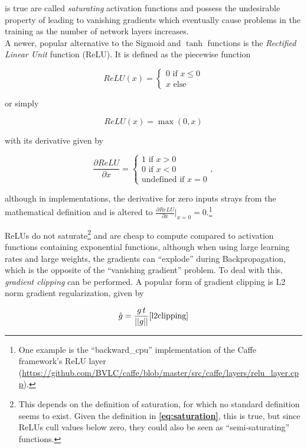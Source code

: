 \noindent is true are called \textit{saturating} activation functions and possess the undesirable property of leading to vanishing gradients which eventually cause problems in the training as the number of network layers increases.\\ 

\noindent A newer, popular alternative to the Sigmoid and $\tanh$ functions is the \textit{Rectified Linear Unit} function (ReLU). It is defined as the piecewise function

\[  ReLU(x) = \begin{cases}
			0 \text{ if } x \leq 0\\
			x \text{ else}
		 \end{cases}
\] 

\noindent or simply

\[ ReLU(x) = \max(0, x) \]

\noindent with its derivative given by 

\[ \frac{\partial ReLU}{\partial x} = \begin{cases}
							1 \text { if } x > 0\\
							0 \text { if } x < 0\\
							 \text{undefined if } x = 0
						        \end{cases},
\]

\noindent although in implementations, the derivative for zero inputs strays from the mathematical definition and is altered to $\frac{\partial ReLU}{\partial x}\rvert_{x=0} = 0$.\footnote{One example is the ``backward\_cpu'' implementation of the Caffe framework's ReLU layer (\url{https://github.com/BVLC/caffe/blob/master/src/caffe/layers/relu_layer.cpp}).}

ReLUs do not saturate\footnote{This depends on the definition of saturation, for which no standard definition seems to exist. Given the definition in \textbf{\ref{eq:saturation}}, this is true, but since ReLUs cull values below zero, they could also be seen as ``semi-saturating'' functions.} and are cheap to compute compared to activation functions containing exponential functions, although when using large learning rates and large weights, the gradients can ``explode'' during Backpropagation, which is the opposite of the ``vanishing gradient'' problem. To deal with this, \textit{gradient clipping} can be performed. A popular form of gradient clipping is L2 norm gradient regularization, given by

\[ \hat{g} = \frac{g\,t}{||g||} \cite{l2clipping} \]


